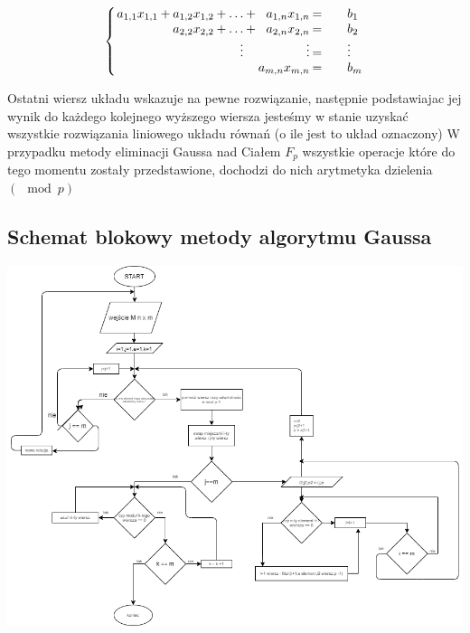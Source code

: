 \documentclass{article}
\begin{document}
\begin{center}
\[
\setlength\arraycolsep{1pt}
\left\{
\begin{array}{rcrcrcrc@{\qquad}l}
a_{1,1}x_{1,1}  & +  &    a_{1,2}x_{1,2}    & + &   \ldots      & + &   a_{1,n}x_{1,n} &   =   &    b_{1} \\
                &    &   a_{2,2}x_{2,2}     & + &   \ldots      & + &   a_{2,n}x_{2,n} &   =   &    b_{2} \\
                &    &                      &   &   \vdots      &   &         \vdots   &   =   &    \vdots \\             
                &    &                      &   &               &   &   a_{m,n}x_{m,n} &   =   &    b_{m} \\
\end{array}
\right.
\]
\end{center}
 Ostatni wiersz układu wskazuje na pewne rozwiązanie, następnie podstawiajac jej wynik do każdego kolejnego wyższego wiersza jesteśmy w stanie uzyskać wszystkie rozwiązania liniowego układu równań (o ile jest to układ oznaczony)
\newline
\newline
W przypadku metody eliminacji Gaussa nad Ciałem \begin{math}  F_{p}  \end{math} wszystkie operacje które do tego momentu zostały przedstawione, dochodzi do nich arytmetyka dzielenia \begin{math}
    ( \mod p )
\end{math}
\newpage

\subsection{Schemat blokowy metody algorytmu Gaussa} \label{Pseudokod Metody eliminacji Gaussa}
\begin{center}
    \includegraphics[width=19cm]{gauss.png}
   
\end{center}
\end{document}
